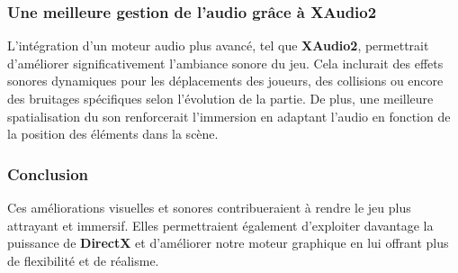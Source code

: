 \subsubsection{Une meilleure gestion de l’audio grâce à XAudio2}
L’intégration d’un moteur audio plus avancé, tel que \textbf{XAudio2}, permettrait d’améliorer significativement l’ambiance sonore du jeu. Cela inclurait des effets sonores dynamiques pour les déplacements des joueurs, des collisions ou encore des bruitages spécifiques selon l’évolution de la partie. De plus, une meilleure spatialisation du son renforcerait l’immersion en adaptant l’audio en fonction de la position des éléments dans la scène.
\subsubsection{Conclusion}
Ces améliorations visuelles et sonores contribueraient à rendre le jeu plus attrayant et immersif. Elles permettraient également d'exploiter davantage la puissance de \textbf{DirectX} et d'améliorer notre moteur graphique en lui offrant plus de flexibilité et de réalisme.
